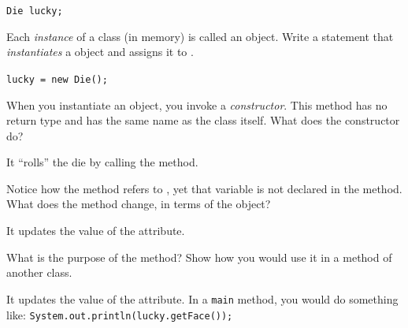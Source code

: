 \begin{answer}
\tt Die lucky;
\end{answer}


\Q Each \emph{instance} of a class (in memory) is called an object. Write a statement that \emph{instantiates} a   object and assigns it to .

\begin{answer}
\tt lucky = new Die();
\end{answer}


\Q When you instantiate an object, you invoke a \emph{constructor}.
This method has no return type and has the same name as the class itself. What does the  constructor do?

\begin{answer}
It ``rolls'' the die by calling the  method.
\end{answer}


\Q Notice how the  method refers to , yet that variable is not declared in the method. What does the  method change, in terms of the  object?

\begin{answer}
It updates the value of the  attribute.
\end{answer}


\Q What is the purpose of the  method? Show how you would use it in a  method of another class.

\begin{answer}
It updates the value of the  attribute. In a {\tt main} method, you would do something like: {\tt System.out.println(lucky.getFace());}
\end{answer}
